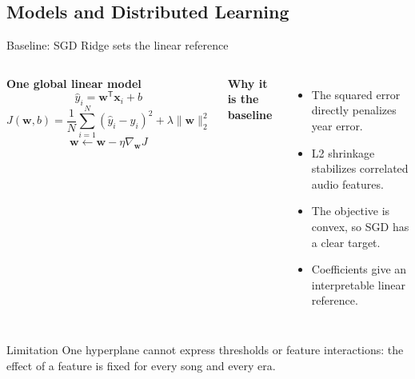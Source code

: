 \subsection{Models and Distributed Learning}

\begin{frame}{Baseline: SGD Ridge sets the linear reference}

\begin{columns}[T,onlytextwidth]
	\textbf{One global linear model}
	\[
		\widehat y_i = \mathbf{w}^{\mathsf T}\mathbf{x}_i+b
	\]
	\[
		J(\mathbf{w},b)=
		\frac{1}{N}\sum_{i=1}^{N}(\widehat y_i-y_i)^2
		+\lambda\lVert\mathbf{w}\rVert_2^2
	\]
	\[
		\mathbf{w}\leftarrow
		\mathbf{w}-\eta\nabla_{\mathbf{w}}J
	\]

	\textbf{Why it is the baseline}
	\begin{itemize}
		\setlength{\itemsep}{4pt}
		\item The squared error directly penalizes year error.
		\item L2 shrinkage stabilizes correlated audio features.
		\item The objective is convex, so SGD has a clear target.
		\item Coefficients give an interpretable linear reference.
	\end{itemize}
\end{columns}

\medskip

\begin{block}{Limitation}
One hyperplane cannot express thresholds or feature interactions: the effect of a
feature is fixed for every song and every era.~{\scriptsize\autocite{hoerl1970ridge}}
\end{block}

\end{frame}

